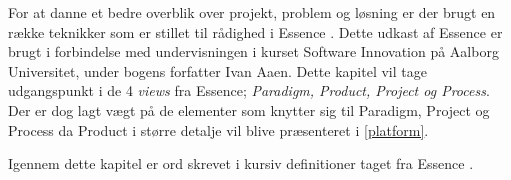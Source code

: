 For at danne et bedre overblik over projekt, problem og løsning er der brugt en række teknikker som er stillet til rådighed i Essence \citep{art:essence}.
Dette udkast af Essence er brugt i forbindelse med undervisningen i kurset Software Innovation på Aalborg Universitet, under bogens forfatter Ivan Aaen.
Dette kapitel vil tage udgangspunkt i de 4 \textit{views} fra Essence; \textit{Paradigm, Product, Project og Process}.
Der er dog lagt vægt på de elementer som knytter sig til Paradigm, Project og Process da Product i større detalje vil blive præsenteret i \cref{platform}.

Igennem dette kapitel er ord skrevet i kursiv definitioner taget fra Essence \citep{art:essence}.
